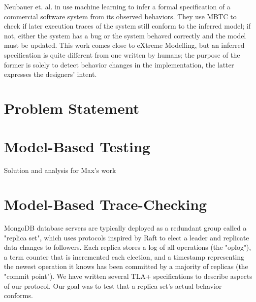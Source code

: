 \documentclass{vldb}
\begin{document}

Neubauer et. al. in \cite{Neubauer12AutomatedContinuousQualityAssurance} use machine learning to infer a formal specification of a commercial software system from its observed behaviors.
They use MBTC to check if later execution traces of the system still conform to the inferred model; if not, either the system has a bug or the system behaved correctly and the model must be updated.
This work comes close to eXtreme Modelling, but an inferred specification is quite different from one written by humans; the purpose of the former is solely to detect behavior changes in the implementation, the latter expresses the designers' intent.


\section{Problem Statement}
\label{sec:problem_statement}

\section{Model-Based Testing}
\label{sec:model_based_testing}

Solution and analysis for Max's work

\section{Model-Based Trace-Checking}
\label{sec:model_based_trace_checking}

MongoDB database servers are typically deployed as a redundant group called a "replica set", which uses protocols inspired by Raft\cite{Ongaro14Raft} to elect a leader and replicate data changes to followers. Each replica stores a log of all operations (the "oplog"), a term counter that is incremented each election, and a timestamp representing the newest operation it knows has been committed by a majority of replicas (the "commit point"). We have written several TLA+ specifications to describe aspects of our protocol. Our goal was to test that a replica set's actual behavior conforms.
\end{document}
